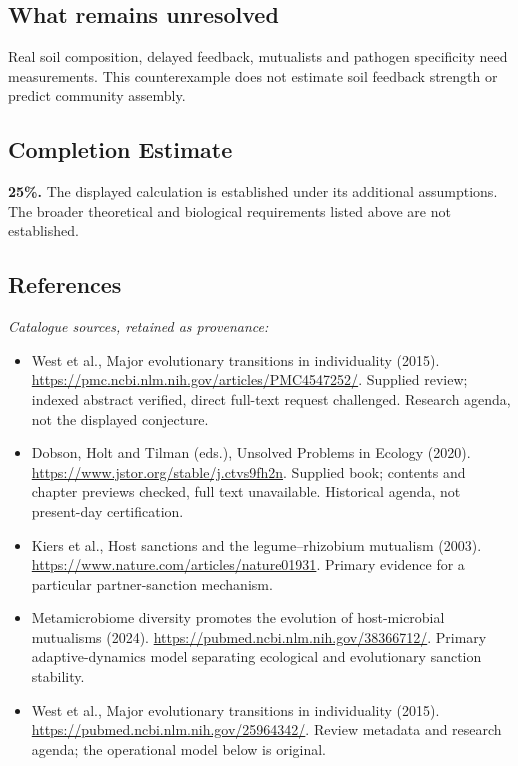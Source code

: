 \documentclass[11pt]{article}
\begin{document}
\subsection{What remains unresolved}
Real soil composition, delayed feedback, mutualists and pathogen specificity need measurements. This counterexample does not estimate soil feedback strength or predict community assembly.
\subsection{Completion Estimate}
\textbf{25\%.} The displayed calculation is established under its additional assumptions. The broader theoretical and biological requirements listed above are not established.
\subsection{References}
\noindent\emph{Catalogue sources, retained as provenance:}
\begin{itemize}
\item West et al., Major evolutionary transitions in individuality (2015). \url{https://pmc.ncbi.nlm.nih.gov/articles/PMC4547252/}. Supplied review; indexed abstract verified, direct full-text request challenged. Research agenda, not the displayed conjecture.
\item Dobson, Holt and Tilman (eds.), Unsolved Problems in Ecology (2020). \url{https://www.jstor.org/stable/j.ctvs9fh2n}. Supplied book; contents and chapter previews checked, full text unavailable. Historical agenda, not present-day certification.
\item Kiers et al., Host sanctions and the legume--rhizobium mutualism (2003). \url{https://www.nature.com/articles/nature01931}. Primary evidence for a particular partner-sanction mechanism.
\item Metamicrobiome diversity promotes the evolution of host-microbial mutualisms (2024). \url{https://pubmed.ncbi.nlm.nih.gov/38366712/}. Primary adaptive-dynamics model separating ecological and evolutionary sanction stability.
\item West et al., Major evolutionary transitions in individuality (2015). \url{https://pubmed.ncbi.nlm.nih.gov/25964342/}. Review metadata and research agenda; the operational model below is original.
\end{itemize}
\clearpage


\appendix
\end{document}
